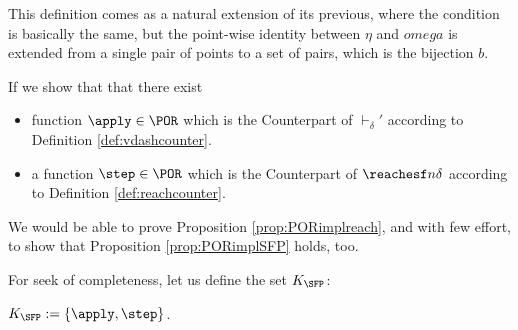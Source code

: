 \begin{conditional}{\notappendix}

  This definition comes as a natural extension of its previous,
  where the condition is basically the same, but the point-wise identity between
  $\eta$ and $omega$ is extended from a single pair of points to a set of
  pairs, which is the bijection $b$.

  If we show that that there exist
  \begin{itemize}
    \item function $\apply \in \POR$ which is the
    Counterpart of $\vdash_\delta '$ according to Definition \ref{def:vdashcounter}.
    \item a function $\step \in \POR$ which is the Counterpart of $\reachesf n \delta$
    according to Definition \ref{def:reachcounter}.
  \end{itemize}

  We would be able to prove Proposition \ref{prop:PORimplreach}, and with few effort,
  to show that Proposition \ref{prop:PORimplSFP} holds, too.

  For seek of completeness, let us define the set $K_\SFP$:

  \begin{defn}[$K_\SFP$]
    $K_\SFP:=\{\apply, \step\}$.
  \end{defn}



























\end{conditional}
